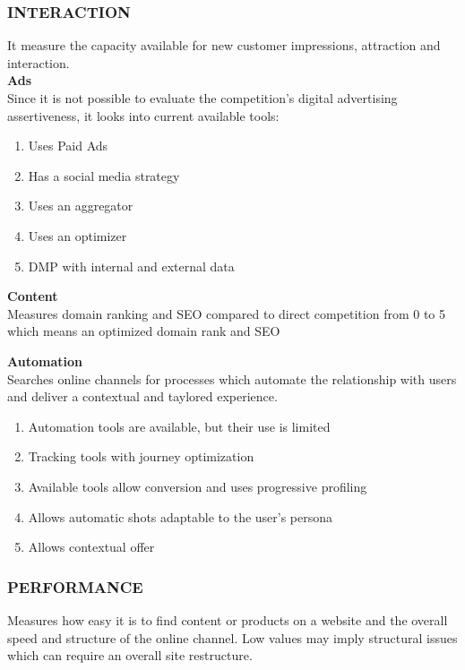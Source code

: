 \setlength{\columnsep}{1cm}
\setlength{\columnseprule}{1pt}
\def\columnseprulecolor{\color{Grey}}
\begin{multicols}{2}
\subsubsection{INTERACTION}
It measure the capacity available for new customer impressions, attraction and interaction.\\

\textbf{\large{Ads}}\\
Since it is not possible to evaluate the competition's digital advertising assertiveness, it looks into current available tools:
\begin{enumerate}[noitemsep]
  \item Uses Paid Ads 
  \item Has a social media strategy
  \item Uses an aggregator
  \item Uses an optimizer
  \item DMP with internal and external data
\end{enumerate}

\textbf{\large{Content}}\\
Measures domain ranking and SEO compared to direct competition from 0 to 5 which means an optimized domain rank and SEO

\textbf{\large{Automation}}\\
Searches online channels for processes which automate the relationship with users and deliver a contextual and taylored experience.
\begin{enumerate}[noitemsep]
  \item Automation tools are available, but their use is limited 
  \item Tracking tools with journey optimization
  \item Available tools allow conversion and uses progressive profiling
  \item Allows automatic shots adaptable to the user's persona
  \item Allows contextual offer
\end{enumerate}

\subsubsection{PERFORMANCE}
Measures how easy it is to find content or products on a website and the overall speed and structure of the online channel. Low values may imply structural issues which can require an overall site restructure.\\


\end{multicols}
